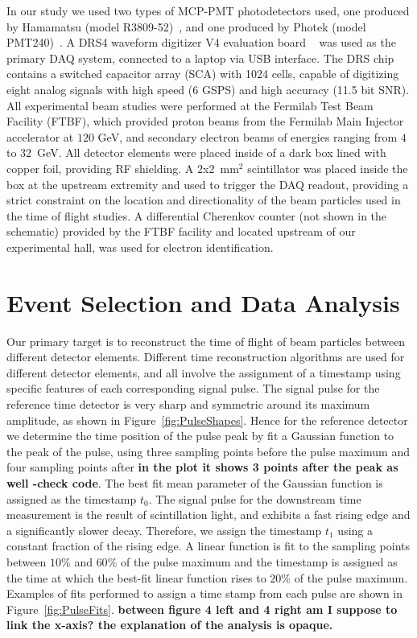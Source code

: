 \documentclass[12pt]{article}
\begin{document}
In our study we used  two types of MCP-PMT photodetectors used, one produced by Hamamatsu (model R3809-52)~\cite{HamamatsuMCP3809}, and one produced by Photek (model
PMT240)~\cite{Photek240}. A DRS4  waveform digitizer V4 evaluation
board ~\cite{DRS4} was used as the primary DAQ system, connected to a laptop via
USB interface.  The DRS chip  contains a switched capacitor array (SCA) with 1024 cells, capable of digitizing eight analog signals with high speed (6 GSPS) and high accuracy (11.5 bit SNR). All experimental beam studies were performed at the Fermilab Test
Beam Facility (FTBF), which provided proton beams from the Fermilab Main
Injector accelerator at $120$ GeV, and secondary electron beams of energies
ranging from $4$ to $32$~GeV. All detector elements were placed inside of a dark box
lined with copper foil, providing RF shielding. A $2$x$2$~$\mathrm{mm}^{2}$
scintillator was placed inside the box at the upstream extremity and used to
trigger the DAQ readout, providing a  strict constraint on the
location and directionality of the beam particles used in the time of flight
studies. A differential Cherenkov counter (not shown in the schematic)  provided by the FTBF
facility and located upstream of our experimental hall,  was used for electron
identification. 

\section{Event Selection and Data Analysis}

Our primary target is to reconstruct the time of flight of beam particles between different detector elements.
Different time reconstruction algorithms are used for different detector elements, and all involve
the assignment of a timestamp using specific features of each corresponding
signal pulse. The signal pulse for the reference time detector is very
sharp and symmetric around its maximum amplitude, as shown in
Figure~\ref{fig:PulseShapes}. Hence for the reference detector we determine
the time position of the pulse peak by fit a Gaussian function to the peak of
the pulse, using three sampling points before the pulse maximum and four
sampling points after {\bf in the plot it shows 3 points after the peak as well -check code}. 
The best fit mean parameter of the Gaussian function is
assigned as the timestamp $t_{0}$. The signal pulse for the downstream time
measurement is the result of scintillation light, and exhibits a
fast rising edge and a significantly slower decay. Therefore, we
assign the timestamp $t_{1}$ using a constant fraction of the rising edge. A
linear function is fit to the sampling points between $10\%$ and $60\%$ of the
pulse maximum and the timestamp is assigned as the time at which the best-fit
linear function rises to $20\%$ of the pulse maximum. Examples of fits performed
to assign a time stamp from each pulse are shown in Figure~\ref{fig:PulseFits}.
 {\bf  between figure 4 left and 4 right
am I suppose to link the x-axis? the explanation of the analysis is opaque.}
\end{document}
